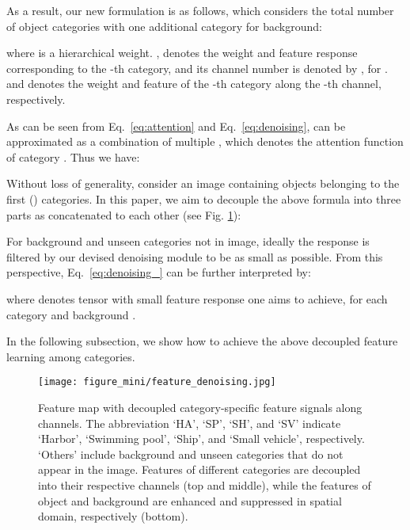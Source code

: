 \documentclass[10pt,journal,compsoc]{IEEEtran}
\begin{document}
As a result, our new formulation is as follows, which considers the total  number of object categories with one additional category for background:

where  is a hierarchical weight. ,  denotes the weight and feature response corresponding to the -th category, and its channel number is denoted by , for .  and  denotes the weight and feature of the -th category along the -th channel, respectively.

As can be seen from Eq.~\ref{eq:attention} and Eq.~\ref{eq:denoising},  can be approximated as a combination of multiple , which denotes the attention function of category . Thus we have:


Without loss of generality, consider an image containing objects belonging to the first  () categories. In this paper, we aim to decouple the above formula into three parts as concatenated to each other (see Fig. \ref{fig:feature_denoising}):


For background and unseen categories not in image, ideally the response is filtered by our devised denoising module to be as small as possible. From this perspective, Eq.~\ref{eq:denoising_} can be further interpreted by:

where  denotes tensor with small feature response one aims to achieve, for each category  and background .

In the following subsection, we show how to achieve the above decoupled feature learning among categories.
\begin{figure}[!tb]
	\begin{center}
		\texttt{[image: figure\_mini/feature\_denoising.jpg]}
	\end{center}
	\caption{Feature map with decoupled category-specific feature signals along channels. The abbreviation `HA', `SP', `SH', and `SV' indicate `Harbor', `Swimming pool', `Ship', and `Small vehicle', respectively. `Others' include background and unseen categories that do not appear in the image. Features of different categories are decoupled into their respective channels (top and middle), while the features of object and background are enhanced and suppressed in spatial domain, respectively (bottom).}
	\label{fig:feature_denoising}
\end{figure}
\end{document}
